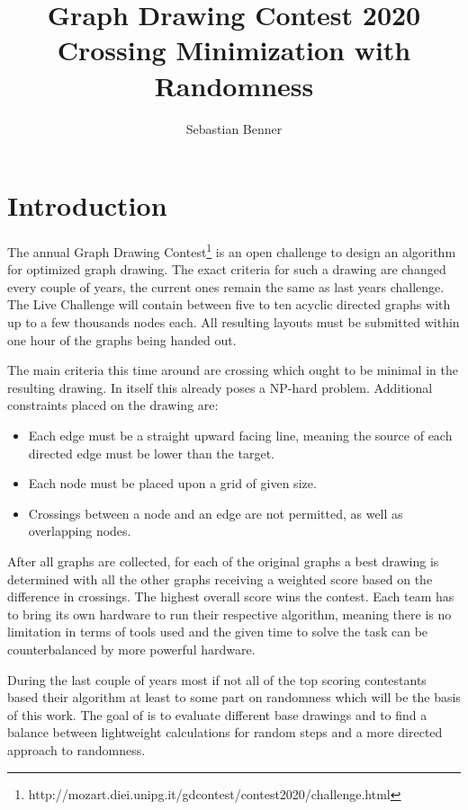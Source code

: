 \documentclass[]{article}
\begin{document}
    \title{Graph Drawing Contest 2020 \\
           Crossing Minimization with Randomness}
    \author{Sebastian Benner}
    \maketitle
    

    \section{Introduction} 

	The annual Graph Drawing Contest\footnote{http://mozart.diei.unipg.it/gdcontest/contest2020/challenge.html} is an open challenge to design an algorithm for optimized graph drawing. The exact criteria for such a drawing are changed every couple of years, the current ones remain the same as last years challenge. The Live Challenge will contain between five to ten acyclic directed graphs with up to a few thousands nodes each. All resulting layouts must be submitted within one hour of the graphs being handed out.

The main criteria this time around are crossing which ought to be minimal in the resulting drawing. In itself this already poses a NP-hard problem. Additional constraints placed on the drawing are:
\begin{itemize}
	\item Each edge must be a straight upward facing line, meaning the source of each directed edge must be lower than the target.
	\item Each node must be placed upon a grid of given size.
	\item Crossings between a node and an edge are not permitted, as well as overlapping nodes.
\end{itemize}

After all graphs are collected, for each of the original graphs a best drawing is determined with all the other graphs receiving a weighted score based on the difference in crossings. The highest overall score wins the contest. Each team has to bring its own hardware to run their respective algorithm, meaning there is no limitation in terms of tools used and the given time to solve the task can be counterbalanced by more powerful hardware.

During the last couple of years most if not all of the top scoring contestants based their algorithm at least to some part on randomness which will be the basis of this work. The goal of is to evaluate different base drawings and to find a balance between lightweight calculations for random steps and a more directed approach to randomness.
\end{document}
